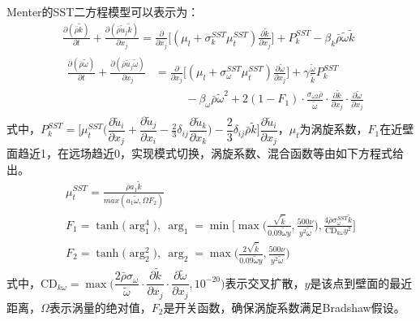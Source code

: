 Menter的SST二方程模型可以表示为：
\begin{align}
&\frac{\partial(\bar{\rho}\tilde{k})}{\partial t}+\frac{\partial(\bar{\rho}\tilde{u}_j\tilde{k})}{\partial x_j}=\frac{\partial}{\partial x_j}\Big[(\mu_l+\sigma_k^{SST}\mu_t^{SST})\frac{\partial\tilde{k}}{\partial x_j}\Big]+P_k^{SST}-\beta_k\bar{\rho}\tilde{\omega}\tilde{k}\\
&\begin{aligned}
\frac{\partial(\bar{\rho}\tilde{\omega})}{\partial t}+\frac{\partial(\bar{\rho}\tilde{u}_j\tilde{\omega})}{\partial x_j}&=\frac{\partial}{\partial x_j}\bigg[(\mu_l+\sigma_\omega^{SST}\mu_t^{SST})\frac{\partial\tilde{\omega}}{\partial x_j}\bigg]+\gamma\frac{\tilde{\omega}}{\tilde{k}}P_k^{SST}\\
&\phantom{==}-\beta_\omega\bar{\rho}\tilde{\omega}^2+2(1-F_1)\cdot\frac{\sigma_{\omega2}\bar{\rho}}{\tilde{\omega}}\cdot\frac{\partial\tilde{k}}{\partial x_j}\cdot\frac{\partial\tilde{\omega}}{\partial x_j}
\end{aligned}
\label{eq:SSTmoxing}
\end{align}
式中，$P_k^{SST}=\Big[\mu_t^{SST}\Big(\dfrac{\partial\tilde{u}_i}{\partial x_j}+\dfrac{\partial\tilde{u}_j}{\partial x_i}-\frac{2}{3}\delta_{ij}\dfrac{\partial\tilde{u}_k}{\partial x_k}\Big)-\dfrac{2}{3}\delta_{ij}\bar{\rho}\tilde{k}\Big]\dfrac{\partial\tilde{u}_i}{\partial x_j}$，$\mu_t$为涡旋系数，$F_1$在近壁面趋近1，在远场趋近0，实现模式切换，涡旋系数、混合函数等由如下方程式给出。
\begin{gather}
\mu_t^{SST}=\frac{\bar{\rho}a_1\tilde{k}}{max(a_1\tilde{\omega},\Omega F_2)}\\
F_1=\tanh\big(\arg_1^4\big),~\arg_1=\min\bigg[\max\bigg(\frac{\sqrt{\tilde{k}}}{0.09\tilde{\omega}y},\frac{500\nu}{y^2\tilde{\omega}}\bigg),\frac{4\bar{\rho}\sigma_\omega^{SST}\tilde{k}}{\text{CD}_{k\omega}y^2}\bigg]\\
F_2=\tanh\big(\arg_2^2\big),~\arg_2=\max\bigg(\frac{2\sqrt{\tilde{k}}}{0.09\tilde{\omega}y},\frac{500\nu}{y^2\tilde{\omega}}\bigg)
\end{gather}
式中，$\text{CD}_{k\omega}=\max\Big(\dfrac{2\bar{\rho}\sigma_{\omega}}{\tilde{\omega}}\cdot\dfrac{\partial\tilde{k}}{\partial x_j}\cdot\dfrac{\partial\tilde{\omega}}{\partial x_j},10^{-20}\Big)$表示交叉扩散，$y$是该点到壁面的最近距离，$\Omega$表示涡量的绝对值，$F_2$是开关函数，确保涡旋系数满足Bradshaw假设\cite{bradshaw1967}。

